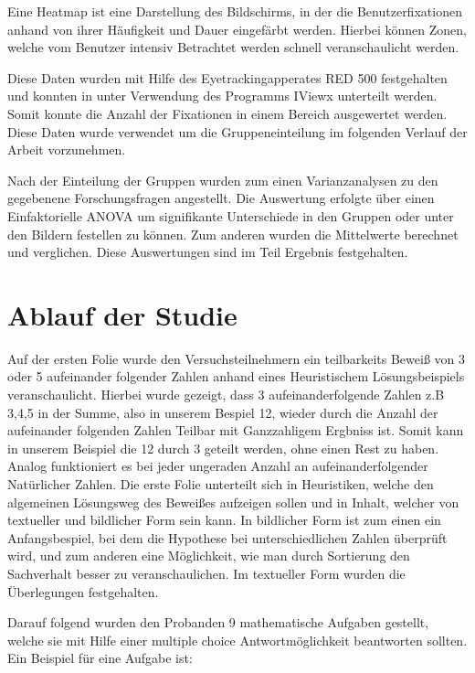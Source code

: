 Eine Heatmap ist eine Darstellung des Bildschirms, in der die Benutzerfixationen anhand von ihrer Häufigkeit und Dauer eingefärbt werden. Hierbei können Zonen, welche vom Benutzer intensiv Betrachtet werden schnell veranschaulicht werden.

Diese Daten wurden mit Hilfe des Eyetrackingapperates RED 500 festgehalten und konnten in unter Verwendung des Programms IViewx unterteilt werden. Somit konnte die Anzahl der Fixationen in einem Bereich ausgewertet werden. Diese Daten wurde verwendet um die Gruppeneinteilung im folgenden Verlauf der Arbeit vorzunehmen.

Nach der Einteilung der Gruppen wurden zum einen Varianzanalysen zu den gegebenene Forschungsfragen angestellt. Die Auswertung erfolgte über einen Einfaktorielle ANOVA um signifikante Unterschiede in den Gruppen oder unter den Bildern festellen zu können. Zum anderen wurden die Mittelwerte berechnet und verglichen. Diese Auswertungen sind im Teil Ergebnis festgehalten.

\section{Ablauf der Studie}

Auf der ersten Folie wurde den Versuchsteilnehmern ein teilbarkeits Beweiß von 3 oder 5 aufeinander folgender Zahlen anhand eines Heuristischem Lösungsbeispiels veranschaulicht. Hierbei wurde gezeigt, dass 3 aufeinanderfolgende Zahlen z.B 3,4,5 in der Summe, also in unserem Bespiel 12, wieder durch die Anzahl der aufeinander folgenden Zahlen Teilbar mit Ganzzahligem Ergbniss ist. Somit kann in unserem Beispiel die 12 durch 3 geteilt werden, ohne einen Rest zu haben.
Analog funktioniert es bei jeder ungeraden Anzahl an aufeinanderfolgender Natürlicher Zahlen. Die erste Folie unterteilt sich in Heuristiken, welche den algemeinen Lösungsweg des Beweißes aufzeigen sollen und in Inhalt, welcher von textueller und bildlicher Form sein kann. In bildlicher Form ist zum einen ein Anfangsbespiel, bei dem die Hypothese bei unterschiedlichen Zahlen überprüft wird, und zum anderen eine Möglichkeit, wie man durch Sortierung den Sachverhalt besser zu veranschaulichen. Im textueller Form wurden die Überlegungen festgehalten.

Darauf folgend wurden den Probanden 9 mathematische Aufgaben gestellt, welche sie mit Hilfe einer multiple choice Antwortmöglichkeit beantworten sollten. Ein Beispiel für eine Aufgabe ist:

